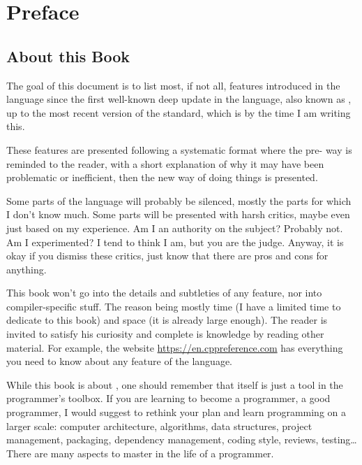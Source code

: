 \chapter{Preface}
\renewcommand*\thesection{\arabic{section}}

\section{About this Book}
The goal of this document is to list most, if not all, features
introduced in the \cpp{} language since the first well-known deep
update in the language, also known as , up to the most recent
version of the standard, which is  by the time I am writing
this.

These features are presented following a systematic format where the
pre- way is reminded to the reader, with a short explanation of
why it may have been problematic or inefficient, then the new way of
doing things is presented.

Some parts of the language will probably be silenced, mostly the parts
for which I don't know much. Some parts will be presented with harsh
critics, maybe even just based on my experience. Am I an authority on
the subject? Probably not. Am I experimented? I tend to think I am,
but you are the judge. Anyway, it is okay if you dismiss these
critics, just know that there are pros and cons for anything.

This book won't go into the details and subtleties of any feature, nor
into compiler-specific stuff. The reason being mostly time (I have a
limited time to dedicate to this book) and space (it is already large
enough). The reader is invited to satisfy his curiosity and complete
is knowledge by reading other material. For example, the website
\url{https://en.cppreference.com} has everything you need to know
about any feature of the language.

\bigskip

While this book is about \cpp, one should remember that \cpp{} itself
is just a tool in the programmer's toolbox. If you are learning \cpp{}
to become a programmer, a good programmer, I would suggest to rethink
your plan and learn programming on a larger scale: computer
architecture, algorithms, data structures, project management,
packaging, dependency management, coding style, reviews, testing…
There are many aspects to master in the life of a programmer.

